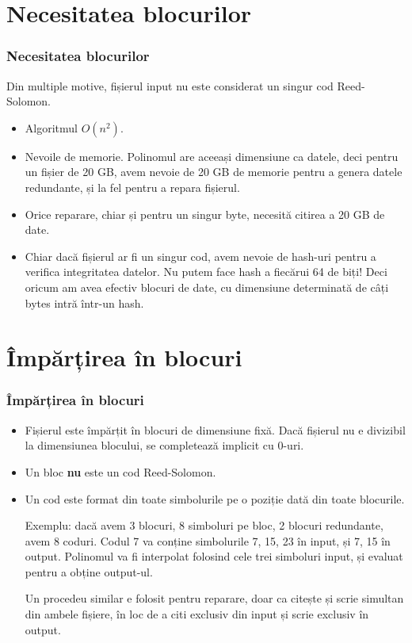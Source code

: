 \documentclass{beamer}
\begin{document}
\section{Necesitatea blocurilor}
\begin{frame}
\frametitle{Necesitatea blocurilor}

Din multiple motive, fișierul input nu este considerat un singur cod Reed-Solomon.

\begin{itemize}
\item
Algoritmul $O(n^2)$.

\item
Nevoile de memorie.
Polinomul are aceeași dimensiune ca datele, deci pentru un fișier de 20 GB, avem nevoie de 20 GB de memorie pentru a genera datele redundante,
și la fel pentru a repara fișierul.

\item
Orice reparare, chiar și pentru un singur byte, necesită citirea a 20 GB de date.

\item
Chiar dacă fișierul ar fi un singur cod, avem nevoie de hash-uri pentru a verifica integritatea datelor.
Nu putem face hash a fiecărui 64 de biți!
Deci oricum am avea efectiv blocuri de date, cu dimensiune determinată de câți bytes intră într-un hash.

\end{itemize}
\end{frame}

\section{Împărțirea în blocuri}
\begin{frame}
\frametitle{Împărțirea în blocuri}
\begin{itemize}
\item
Fișierul este împărțit în blocuri de dimensiune fixă.
Dacă fișierul nu e divizibil la dimensiunea blocului, se completează implicit cu 0-uri.

\item
Un bloc \textbf{nu} este un cod Reed-Solomon.

\item
Un cod este format din toate simbolurile pe o poziție dată din toate blocurile.

Exemplu: dacă avem 3 blocuri, 8 simboluri pe bloc, 2 blocuri redundante, avem 8 coduri.
Codul 7 va conține simbolurile 7, 15, 23 în input, și 7, 15 în output.
Polinomul va fi interpolat folosind cele trei simboluri input, și evaluat pentru a obține output-ul.

Un procedeu similar e folosit pentru reparare, doar ca citește și scrie simultan din ambele fișiere,
în loc de a citi exclusiv din input și scrie exclusiv în output.

\end{itemize}
\end{frame}
\end{document}
